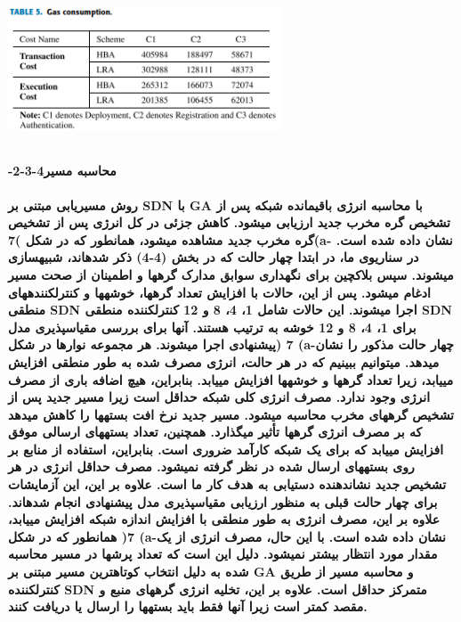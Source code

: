 \documentclass{article} %
\begin{document}
\noindent 
{\bf \includegraphics*[width=3.20in, height=1.70in]{image15}}

\noindent 
\paragraph{ -2-3-4محاسبه مسیر}

\noindent 
{\bf روش مسیریابی مبتنی بر SDN با GA با محاسبه انرژی باقیمانده شبکه پس از تشخیص گره مخرب جدید ارزیابی میشود. کاهش جزئی در کل انرژی پس از تشخیص گره مخرب جدید مشاهده میشود، همانطور که در شکل )7(a- نشان داده شده است. در سناریوی ما، در ابتدا چهار حالت که در بخش (4-4) ذکر شدهاند، شبیهسازی میشوند. سپس بلاکچین برای نگهداری سوابق مدارک گرهها و اطمینان از صحت مسیر ادغام میشود. پس از این، حالات با افزایش تعداد گرهها، خوشهها و کنترلکنندههای منطقی SDN اجرا میشوند. این حالات شامل 1، 4، 8 و 12 کنترلکننده منطقی SDN برای 1، 4، 8 و 12 خوشه به ترتیب هستند. آنها برای بررسی مقیاسپذیری مدل پیشنهادی اجرا میشوند. هر مجموعه نوارها در شکل) 7 (a-چهار حالت مذکور را نشان میدهد. میتوانیم ببینیم که در هر حالت، انرژی مصرف شده به طور منطقی افزایش مییابد، زیرا تعداد گرهها و خوشهها افزایش مییابد. بنابراین، هیچ اضافه باری از مصرف انرژی وجود ندارد. مصرف انرژی کلی شبکه حداقل است زیرا مسیر جدید پس از تشخیص گرههای مخرب محاسبه میشود. مسیر جدید نرخ افت بستهها را کاهش میدهد که بر مصرف انرژی گرهها تأثیر میگذارد. همچنین، تعداد بستههای ارسالی موفق افزایش مییابد که برای یک شبکه کارآمد ضروری است. بنابراین، استفاده از منابع بر روی بستههای ارسال شده در نظر گرفته نمیشود. مصرف حداقل انرژی در هر تشخیص جدید نشاندهنده دستیابی به هدف کار ما است. علاوه بر این، این آزمایشات برای چهار حالت قبلی به منظور ارزیابی مقیاسپذیری مدل پیشنهادی انجام شدهاند. علاوه بر این، مصرف انرژی به طور منطقی با افزایش اندازه شبکه افزایش مییابد، همانطور که در شکل )7 (a-نشان داده شده است. با این حال، مصرف انرژی از یک مقدار مورد انتظار بیشتر نمیشود. دلیل این است که تعداد پرشها در مسیر محاسبه شده به دلیل انتخاب کوتاهترین مسیر مبتنی بر GA و محاسبه مسیر از طریق کنترلکننده SDN متمرکز حداقل است. علاوه بر این، تخلیه انرژی گرههای منبع و مقصد کمتر است زیرا آنها فقط باید بستهها را ارسال یا دریافت کنند.}
\end{document}

